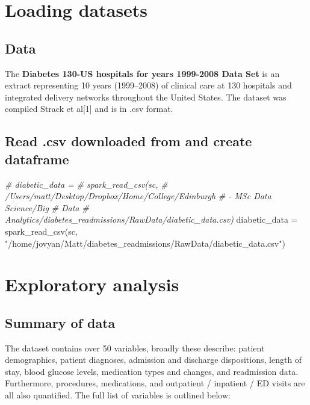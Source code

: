 \documentclass[
]{article}
\newenvironment{Shaded}{\begin{snugshade}}{\end{snugshade}}
\newcommand{\CommentTok}[1]{\textcolor[rgb]{0.56,0.35,0.01}{\textit{#1}}}
\newcommand{\FunctionTok}[1]{\textcolor[rgb]{0.00,0.00,0.00}{#1}}
\newcommand{\NormalTok}[1]{#1}
\newcommand{\OtherTok}[1]{\textcolor[rgb]{0.56,0.35,0.01}{#1}}
\newcommand{\StringTok}[1]{\textcolor[rgb]{0.31,0.60,0.02}{#1}}
\begin{document}
\hypertarget{loading-datasets}{%
\section{Loading datasets}\label{loading-datasets}}

\hypertarget{data}{%
\subsection{Data}\label{data}}

The \textbf{Diabetes 130-US hospitals for years 1999-2008 Data Set} is
an extract representing 10 years (1999--2008) of clinical care at 130
hospitals and integrated delivery networks throughout the United States.
The dataset was compiled Strack et al{[}1{]} and is in .csv format.

\hypertarget{read-.csv-downloaded-from-and-create-dataframe}{%
\subsection{Read .csv downloaded from and create
dataframe}\label{read-.csv-downloaded-from-and-create-dataframe}}

\begin{Shaded}
\begin{Highlighting}[]
\CommentTok{\# diabetic\_data =}
\CommentTok{\# spark\_read\_csv(sc,}
\CommentTok{\# \textquotesingle{}/Users/matt/Desktop/Dropbox/Home/College/Edinburgh}
\CommentTok{\# {-} MSc Data Science/Big}
\CommentTok{\# Data}
\CommentTok{\# Analytics/diabetes\_readmissions/RawData/diabetic\_data.csv\textquotesingle{})}
\NormalTok{diabetic\_data }\OtherTok{=} \FunctionTok{spark\_read\_csv}\NormalTok{(sc,}
    \StringTok{"/home/jovyan/Matt/diabetes\_readmissions/RawData/diabetic\_data.csv"}\NormalTok{)}
\end{Highlighting}
\end{Shaded}

\hypertarget{exploratory-analysis}{%
\section{Exploratory analysis}\label{exploratory-analysis}}

\hypertarget{summary-of-data}{%
\subsection{Summary of data}\label{summary-of-data}}

The dataset contains over 50 variables, broadly these describe: patient
demographics, patient diagnoses, admission and discharge dispositions,
length of stay, blood glucose levels, medication types and changes, and
readmission data. Furthermore, procedures, medications, and outpatient /
inpatient / ED visits are all also quantified. The full list of
variables is outlined below:
\end{document}
